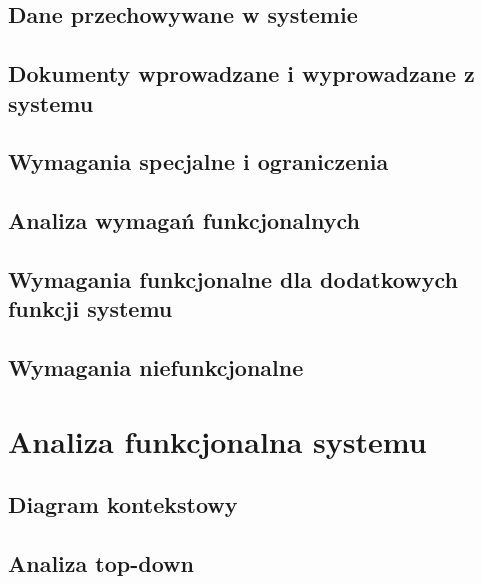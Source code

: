 \documentclass[paper=a4, fontsize=12pt]{scrartcl}
\numberwithin{equation}{section}		%
\numberwithin{figure}{section}			%
\numberwithin{table}{section}				%
\begin{document}
	\subsection{Dane przechowywane w systemie}
		

	\subsection{Dokumenty wprowadzane i wyprowadzane z systemu}
		

	\subsection{Wymagania specjalne i ograniczenia}
		


	\subsection{Analiza wymagań funkcjonalnych}
		

	\subsection{Wymagania funkcjonalne dla dodatkowych funkcji systemu}
		

	\subsection{Wymagania niefunkcjonalne}
		

\section{Analiza funkcjonalna systemu}

	\subsection{Diagram kontekstowy}
		

	\subsection{Analiza top-down}
		
\end{document}

